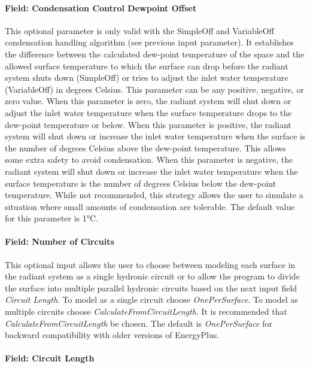 \paragraph{Field: Condensation Control Dewpoint Offset}\label{field-condensation-control-dewpoint-offset-1}

This optional parameter is only valid with the SimpleOff and VariableOff condensation handling algorithm (see previous input parameter). It establishes the difference between the calculated dew-point temperature of the space and the allowed surface temperature to which the surface can drop before the radiant system shuts down (SimpleOff) or tries to adjust the inlet water temperature (VariableOff) in degrees Celsius. This parameter can be any positive, negative, or zero value. When this parameter is zero, the radiant system will shut down or adjust the inlet water temperature when the surface temperature drops to the dew-point temperature or below. When this parameter is positive, the radiant system will shut down or increase the inlet water temperature when the surface is the number of degrees Celsius above the dew-point temperature. This allows some extra safety to avoid condensation. When this parameter is negative, the radiant system will shut down or increase the inlet water temperature when the surface temperature is the number of degrees Celsius below the dew-point temperature. While not recommended, this strategy allows the user to simulate a situation where small amounts of condensation are tolerable. The default value for this parameter is 1°C.

\paragraph{Field: Number of Circuits}\label{field-number-of-circuits-1}

This optional input allows the user to choose between modeling each surface in the radiant system as a single hydronic circuit or to allow the program to divide the surface into multiple parallel hydronic circuits based on the next input field \emph{Circuit Length}. To model as a single circuit choose \emph{OnePerSurface}. To model as multiple circuits choose \emph{CalculateFromCircuitLength}. It is recommended that \emph{CalculateFromCircuitLength} be chosen. The default is \emph{OnePerSurface} for backward compatibility with older versions of EnergyPlus.

\paragraph{Field: Circuit Length}\label{field-circuit-length-1}


